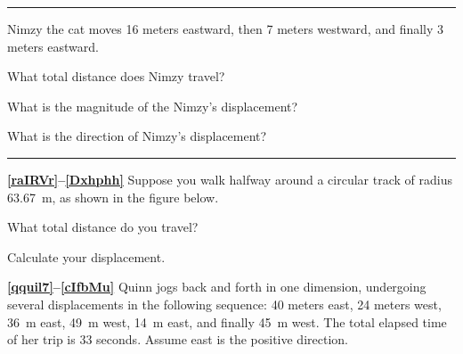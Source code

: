 \documentclass{article}
\begin{document}
\hrule

\vspace{1em}

Nimzy the cat moves 16 meters eastward, then 7 meters westward, and finally 3 meters eastward.

\begin{exercise} \label{umzXid}
    What total distance does Nimzy travel?
\end{exercise}

\begin{exercise} \label{CO3yuB}
    What is the magnitude of the Nimzy's displacement?
\end{exercise}

\begin{exercise} \label{2O3f3z}
    What is the direction of Nimzy's displacement?
\end{exercise}

\hrule

\vspace{1em}

\textbf{\ref{raIRVr}--\ref{Dxhphh}} Suppose you walk halfway around a circular track of radius \SI{63.67}{m}, as shown in the figure below.

\begin{center}
\end{center}

\begin{exercise} \label{raIRVr}
    What total distance do you travel?
\end{exercise}

\begin{exercise} \label{Dxhphh}
    Calculate your displacement.
\end{exercise}


\textbf{\ref{qquil7}--\ref{cIfbMu}} Quinn jogs back and forth in one dimension, undergoing several displacements in the following sequence: 40 meters east, 24 meters west, \SI{36}{m} east, \SI{49}{m} west, \SI{14}{m} east, and finally \SI{45}{m} west. The total elapsed time of her trip is 33 seconds. Assume east is the positive direction.
\end{document}
